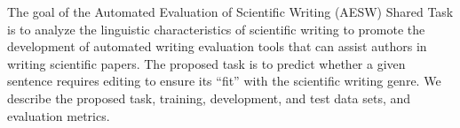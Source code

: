 The goal of the Automated Evaluation of Scientific Writing (AESW) Shared Task is to analyze the linguistic characteristics of scientific writing to promote the development of automated writing evaluation tools that can assist authors in writing scientific papers. The proposed task is to predict whether a given sentence requires editing to ensure its ``fit'' with the scientific writing genre. We describe the proposed task, training, development, and test data sets, and evaluation metrics.
